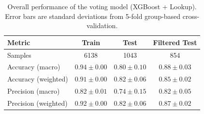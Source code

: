 \begin{table}[h!]
\centering
\caption{Overall performance of the voting model (XGBoost + Lookup). Error bars are standard deviations from 5-fold group-based cross-validation.}
\begin{tabular}{lccc}
\toprule
\textbf{Metric} & \textbf{Train} & \textbf{Test} & \textbf{Filtered Test} \\
\midrule
Samples & 6138 & 1043 & 854 \\[3pt]
Accuracy (macro) & $0.94 \pm 0.00$ & $0.80 \pm 0.10$ & $0.88 \pm 0.03$ \\
Accuracy (weighted) & $0.91 \pm 0.00$ & $0.82 \pm 0.06$ & $0.85 \pm 0.02$ \\[3pt]
Precision (macro) & $0.82 \pm 0.01$ & $0.74 \pm 0.15$ & $0.82 \pm 0.05$ \\
Precision (weighted) & $0.92 \pm 0.00$ & $0.82 \pm 0.06$ & $0.87 \pm 0.02$ \\
\bottomrule
\end{tabular}
\label{tab:model_performance}
\end{table}
